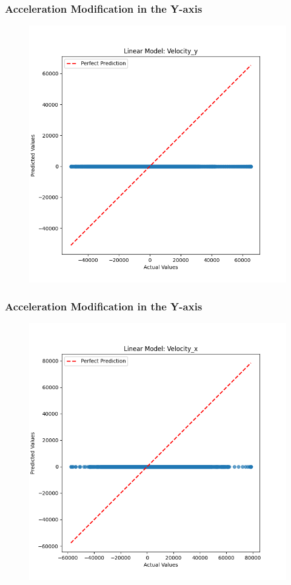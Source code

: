 \begin{frame}
  \frametitle{Acceleration Modification in the Y-axis}
  \begin{figure}
    \centering
    \includegraphics[width=0.5 \textwidth]{figures/acceleration_mod/acceleration_mod_vel_y.png}
  \end{figure}
\end{frame}


\begin{frame}
  \frametitle{Acceleration Modification in the Y-axis}
  \begin{figure}
    \centering
    \includegraphics[width=0.5 \textwidth]{figures/acceleration_mod/acceleration_mod_vel_x.png}
  \end{figure}
\end{frame}




